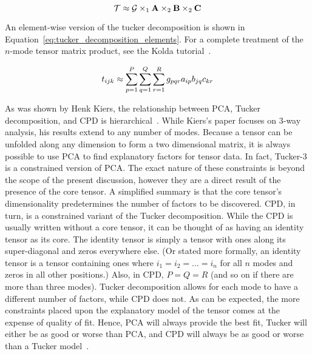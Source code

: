 \documentclass[../dissertation.tex]{subfiles}
\begin{document}
\begin{equation}\label{eq:tucker_decomposition}
  \mathcal{T} \approx \mathcal{G} \times_1 \mathrm{\bf A} \times_2 \mathrm{\bf B} \times_2
  \mathrm{\bf C}
\end{equation}

An element-wise version of the tucker decomposition is shown in
Equation~\ref{eq:tucker_decomposition_elements}.  For a complete
treatment of the $n$-mode tensor matrix product, see the Kolda
tutorial~\cite{kolda2009}.

\begin{equation}\label{eq:tucker_decomposition_elements}
  t_{ijk} \approx \displaystyle\sum_{p=1}^P \displaystyle\sum_{q=1}^Q \displaystyle\sum_{r=1}^R
  g_{pqr}a_{ip}b_{jq}c_{kr}
\end{equation}

As was shown by Henk Kiers, the relationship between PCA, Tucker
decomposition, and CPD is hierarchical~\cite{kiers1991}.  While
Kiers's paper focuses on 3-way analysis, his results extend to any
number of modes.  Because a tensor can be unfolded along any dimension
to form a two dimensional matrix, it is always possible to use PCA to
find explanatory factors for tensor data.  In fact, Tucker-3 is a
constrained version of PCA.  The exact nature of these constraints is
beyond the scope of the present discussion, however they are a direct
result of the presence of the core tensor.  A simplified summary is
that the core tensor's dimensionality predetermines the number of
factors to be discovered.  CPD, in turn, is a constrained variant of
the Tucker decomposition.  While the CPD is usually written without a
core tensor, it can be thought of as having an identity tensor as its
core.  The identity tensor is simply a tensor with ones along its
super-diagonal and zeros everywhere else.  (Or stated more formally,
an identity tensor is a tensor containing ones where $i_1 = i_2 =
\ldots =i_n$ for all $n$ modes and zeros in all other positions.)
Also, in CPD, $P=Q=R$ (and so on if there are more than three modes).
Tucker decomposition allows for each mode to have a different number
of factors, while CPD does not.  As can be expected, the more
constraints placed upon the explanatory model of the tensor comes at
the expense of quality of fit.  Hence, PCA will always provide the
best fit, Tucker will either be as good or worse than PCA, and CPD
will always be as good or worse than a Tucker model~\cite{kiers1991,
  bro1997}.
\end{document}

